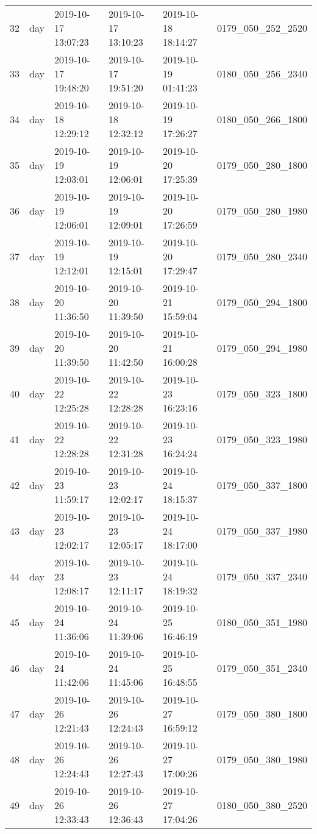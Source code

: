 \begin{longtable}{rlllll}
      32 &      day & 2019-10-17 13:07:23 & 2019-10-17 13:10:23 & 2019-10-18 18:14:27 & 0179\_050\_252\_2520 \\
      33 &      day & 2019-10-17 19:48:20 & 2019-10-17 19:51:20 & 2019-10-19 01:41:23 & 0180\_050\_256\_2340 \\
      34 &      day & 2019-10-18 12:29:12 & 2019-10-18 12:32:12 & 2019-10-19 17:26:27 & 0180\_050\_266\_1800 \\
      35 &      day & 2019-10-19 12:03:01 & 2019-10-19 12:06:01 & 2019-10-20 17:25:39 & 0179\_050\_280\_1800 \\
      36 &      day & 2019-10-19 12:06:01 & 2019-10-19 12:09:01 & 2019-10-20 17:26:59 & 0179\_050\_280\_1980 \\
      37 &      day & 2019-10-19 12:12:01 & 2019-10-19 12:15:01 & 2019-10-20 17:29:47 & 0179\_050\_280\_2340 \\
      38 &      day & 2019-10-20 11:36:50 & 2019-10-20 11:39:50 & 2019-10-21 15:59:04 & 0179\_050\_294\_1800 \\
      39 &      day & 2019-10-20 11:39:50 & 2019-10-20 11:42:50 & 2019-10-21 16:00:28 & 0179\_050\_294\_1980 \\
      40 &      day & 2019-10-22 12:25:28 & 2019-10-22 12:28:28 & 2019-10-23 16:23:16 & 0179\_050\_323\_1800 \\
      41 &      day & 2019-10-22 12:28:28 & 2019-10-22 12:31:28 & 2019-10-23 16:24:24 & 0179\_050\_323\_1980 \\
      42 &      day & 2019-10-23 11:59:17 & 2019-10-23 12:02:17 & 2019-10-24 18:15:37 & 0179\_050\_337\_1800 \\
      43 &      day & 2019-10-23 12:02:17 & 2019-10-23 12:05:17 & 2019-10-24 18:17:00 & 0179\_050\_337\_1980 \\
      44 &      day & 2019-10-23 12:08:17 & 2019-10-23 12:11:17 & 2019-10-24 18:19:32 & 0179\_050\_337\_2340 \\
      45 &      day & 2019-10-24 11:36:06 & 2019-10-24 11:39:06 & 2019-10-25 16:46:19 & 0180\_050\_351\_1980 \\
      46 &      day & 2019-10-24 11:42:06 & 2019-10-24 11:45:06 & 2019-10-25 16:48:55 & 0179\_050\_351\_2340 \\
      47 &      day & 2019-10-26 12:21:43 & 2019-10-26 12:24:43 & 2019-10-27 16:59:12 & 0179\_050\_380\_1800 \\
      48 &      day & 2019-10-26 12:24:43 & 2019-10-26 12:27:43 & 2019-10-27 17:00:26 & 0179\_050\_380\_1980 \\
      49 &      day & 2019-10-26 12:33:43 & 2019-10-26 12:36:43 & 2019-10-27 17:04:26 & 0180\_050\_380\_2520 \\

\end{longtable}
